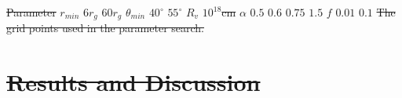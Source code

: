 \documentclass[preprint, a4paper, 11pt]{aastex}
\providecommand{\DIFdel}[1]{{\protect\color{red}\sout{#1}}}                      %
\providecommand{\DIFdelbegin}{} %
\begin{document}
\DIFdelbegin %
\DIFdel{Parameter }%
\DIFdel{$r_{min}$ 	}%
\DIFdel{$6r_{g}$ }%
\DIFdel{$60r_{g}$ }%
\DIFdel{$\theta_{min}$ 	}%
\DIFdel{$40^{\circ}$ }%
\DIFdel{$55^{\circ}$ }%
\DIFdel{$R_v$  	        }%
\DIFdel{$10^{18}$cm }%
\DIFdel{$\alpha$ 	}%
\DIFdel{$0.5$ }%
\DIFdel{$0.6$ }%
\DIFdel{$0.75$ }%
\DIFdel{$1.5$ }%
\DIFdel{$f$ 	}%
\DIFdel{$0.01$ }%
\DIFdel{$0.1$ }%
{%
\DIFdel{The grid points used in the parameter search.}}




\section{\DIFdel{Results and Discussion}}
\addtocounter{section}{-1}%

\end{document}
